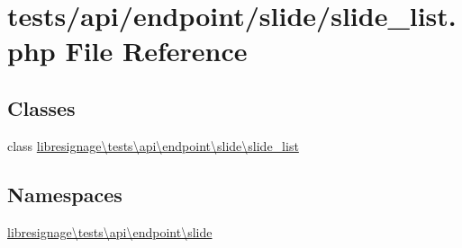 \hypertarget{tests_2api_2endpoint_2slide_2slide__list_8php}{}\section{tests/api/endpoint/slide/slide\+\_\+list.php File Reference}
\label{tests_2api_2endpoint_2slide_2slide__list_8php}
\subsection*{Classes}
\begin{DoxyCompactItemize}
\item 
class \hyperlink{classlibresignage_1_1tests_1_1api_1_1endpoint_1_1slide_1_1slide__list}{libresignage\textbackslash{}tests\textbackslash{}api\textbackslash{}endpoint\textbackslash{}slide\textbackslash{}slide\+\_\+list}
\end{DoxyCompactItemize}
\subsection*{Namespaces}
\begin{DoxyCompactItemize}
\item 
 \hyperlink{namespacelibresignage_1_1tests_1_1api_1_1endpoint_1_1slide}{libresignage\textbackslash{}tests\textbackslash{}api\textbackslash{}endpoint\textbackslash{}slide}
\end{DoxyCompactItemize}
